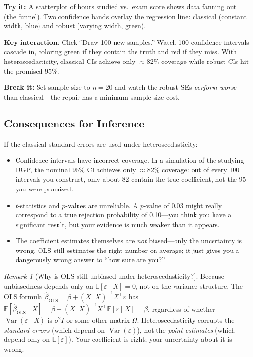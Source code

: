 \documentclass[11pt,a4paper]{article}
\theoremstyle{definition}
\theoremstyle{plain}
\theoremstyle{remark}
\newtheorem{remark}{Remark}[section]
\newcommand{\E}{\mathbb{E}}
\newcommand{\Var}{\operatorname{Var}}
\newcommand{\bols}{\hat{\beta}_{\text{OLS}}}
\begin{document}
\begin{vizspec}[title={``The Funnel of False Confidence'' --- Coverage Simulator}]
\textbf{Try it:} A scatterplot of hours studied vs.\ exam score shows data fanning out (the funnel). Two confidence bands overlay the regression line: classical (constant width, blue) and robust (varying width, green).

\textbf{Key interaction:} Click ``Draw 100 new samples.'' Watch 100 confidence intervals cascade in, coloring green if they contain the truth and red if they miss. With heteroscedasticity, classical CIs achieve only $\approx$82\% coverage while robust CIs hit the promised 95\%.

\textbf{Break it:} Set sample size to $n = 20$ and watch the robust SEs \emph{perform worse} than classical---the repair has a minimum sample-size cost.
\end{vizspec}

\subsection{Consequences for Inference}

If the classical standard errors are used under heteroscedasticity:
\begin{itemize}[nosep]
  \item Confidence intervals have incorrect coverage.
        In a simulation of the studying DGP, the nominal 95\% CI achieves only $\approx$82\% coverage: out of every 100 intervals you construct, only about 82 contain the true coefficient, not the 95 you were promised.
  \item $t$-statistics and $p$-values are unreliable.
        A $p$-value of 0.03 might really correspond to a true rejection probability of 0.10---you think you have a significant result, but your evidence is much weaker than it appears.
  \item The coefficient estimates themselves are \emph{not} biased---only the uncertainty is wrong.
        OLS still estimates the right number on average; it just gives you a dangerously wrong answer to ``how sure are you?''
\end{itemize}

\begin{remark}[Why is OLS still unbiased under heteroscedasticity?]
Because unbiasedness depends only on $\E[\varepsilon \mid X] = 0$, not on the variance structure. The OLS formula $\bols = \beta + (X^\top X)^{-1} X^\top \varepsilon$ has $\E[\bols \mid X] = \beta + (X^\top X)^{-1} X^\top \E[\varepsilon \mid X] = \beta$, regardless of whether $\Var(\varepsilon \mid X)$ is $\sigma^2 I$ or some other matrix $\Omega$. Heteroscedasticity corrupts the \emph{standard errors} (which depend on $\Var(\varepsilon)$), not the \emph{point estimates} (which depend only on $\E[\varepsilon]$). Your coefficient is right; your uncertainty about it is wrong.
\end{remark}
\end{document}
